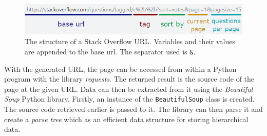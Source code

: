 \documentclass[12pt,a4paper]{article}
\newcommand{\captionstyle}[1] {
    \small{#1}
}
\begin{document}

\begin{figure}[!htb]%
    \centering
    \includegraphics[width=1.0\columnwidth]{so-url}%
    \caption[The structure of a Stack Overflow URL.]{\captionstyle{The structure of a Stack Overflow URL. Variables and their values are appended to the base url. The separator used is \texttt{\&}.}}%
    \label{fig:so-url}%
\end{figure}

With the generated URL, the page can be accessed from within a Python program with the library \textit{requests}. The returned result is the source code of the page at the given URL. Data can then be extracted from it using the \textit{Beautiful Soup} Python library. Firstly, an instance of the \texttt{BeautifulSoup} class is created. The source code retrieved earlier is passed to it. The library can then parse it and create a \textit{parse tree} which as an efficient data structure for storing hierarchical data. 
\end{document}
